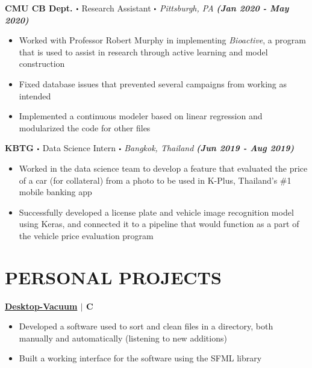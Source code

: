 \documentclass[10pt]{article}
\newcommand\sbullet[1][.5]{\mathbin{\vcenter{\hbox{\scalebox{#1}{$\bullet$}}}}}
\newcommand{\CC}{C\nolinebreak\hspace{-.05em}\raisebox{.4ex}{\tiny\bf +}\nolinebreak\hspace{-.10em}\raisebox{.4ex}{\tiny\bf +}}
\begin{document}

  \textbf{\large CMU CB Dept. $\sbullet$} {\large Research Assistant $\sbullet$ \textit{Pittsburgh, PA} \hfill \textit{\textbf{(Jan 2020 - May 2020)}}}

  \vspace*{-0.2cm}
  \begin{itemize}
    \itemsep-0.4em
    \item \textcolor{lighterG}{Worked with Professor Robert Murphy in implementing \textit{Bioactive}, a program that is used to assist in research through active learning and model construction}
    \item \textcolor{lighterG}{Fixed database issues that prevented several campaigns from working as intended}
    \item \textcolor{lighterG}{Implemented a continuous modeler based on linear regression and modularized the code for other files}
  \end{itemize}

  \textbf{\large KBTG $\sbullet$} {\large Data Science Intern $\sbullet$ \textit{Bangkok, Thailand} \hfill \textit{\textbf{(Jun 2019 - Aug 2019)}}}

  \vspace*{-0.2cm}
  \begin{itemize}
    \itemsep-0.4em
    \item \textcolor{lighterG}{Worked in the data science team to develop a feature that evaluated the price of a car (for collateral) from a photo to be used in K-Plus, Thailand's \#1 mobile banking app}
    \item \textcolor{lighterG}{Successfully developed a license plate and vehicle image recognition model using Keras, and connected it to a pipeline that would function as a part of the vehicle price evaluation program}
  \end{itemize}

  \section*{\large \textcolor{lighterB}{PERSONAL PROJECTS}}
  \vspace*{-0.23cm}

  \textbf{\large \href{https://github.com/Piratach/desktop-vacuum}{Desktop-Vacuum} $\mid$ \CC} 
  \vspace*{-0.17cm}
  \begin{itemize}
    \itemsep-0.4em
    \item \textcolor{lighterG}{Developed a software used to sort and clean files in a directory, both manually and automatically (listening to new additions)}
    \item \textcolor{lighterG}{Built a working interface for the software using the SFML library}
  \end{itemize}
\end{document}
